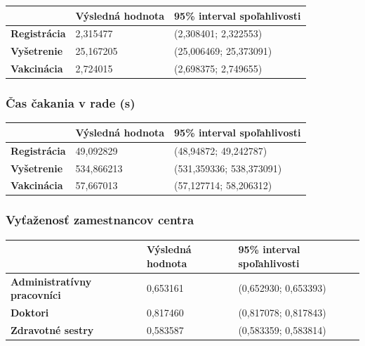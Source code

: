 \documentclass[letterpaper]{article}
\begin{document}
	\begin{table}[hbt!]
		\begin{tabular}{p{6cm}|p{4.5cm}p{4.5cm}}
			& \textbf{Výsledná hodnota} & \textbf{95\% interval spoľahlivosti} \\
			\hline\hline
			\textbf{Registrácia} 	& 2,315477            & (2,308401; 2,322553)			
			\\\hline
			\textbf{Vyšetrenie}  	& 25,167205           & (25,006469; 25,373091)	
			\\\hline
			\textbf{Vakcinácia}  	& 2,724015            & (2,698375; 2,749655)
		\end{tabular}
	\end{table}
	
	\subsubsection*{Čas čakania v rade (s)}
	
	\begin{table}[hbt!]
		\begin{tabular}{p{6cm}|p{4.5cm}p{4.5cm}}
			& \textbf{Výsledná hodnota} & \textbf{95\% interval spoľahlivosti} \\
			\hline\hline
			\textbf{Registrácia} 	& 49,092829           & (48,94872; 49,242787)			
			\\\hline
			\textbf{Vyšetrenie}  	& 534,866213          & (531,359336; 538,373091)	
			\\\hline
			\textbf{Vakcinácia}  	& 57,667013           & (57,127714; 58,206312)
		\end{tabular}
	\end{table}
	
	\subsubsection*{Vyťaženosť zamestnancov centra}
	
	\begin{table}[hbt!]
		\begin{tabular}{p{6cm}|p{4.5cm}p{4.5cm}}
			& \textbf{Výsledná hodnota} & \textbf{95\% interval spoľahlivosti} \\
			\hline\hline
			\textbf{Administratívny pracovníci} 	& 0,653161            & (0,652930; 0,653393)			
			\\\hline
			\textbf{Doktori}  						& 0,817460            & (0,817078; 0,817843)	
			\\\hline
			\textbf{Zdravotné sestry}  				& 0,583587            & (0,583359; 0,583814)
		\end{tabular}
	\end{table}
	
\end{document}
